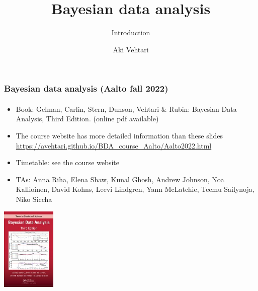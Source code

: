 \documentclass[english,t]{beamer}
\date{}
\title[]{Bayesian data analysis}
\subtitle{Introduction}
\author{Aki Vehtari}
\institute[Aalto University]{}
\begin{document}
\begin{frame}
  \frametitle{Bayesian data analysis (Aalto fall 2022)}  %
  \framesubtitle{}
  \begin{itemize}
  \item Book: Gelman, Carlin, Stern, Dunson, Vehtari \& Rubin: Bayesian Data
    Analysis, Third Edition. {\footnotesize (online pdf available)}
  \item The course website has more detailed information than these slides\\
    {\small\url{https://avehtari.github.io/BDA_course_Aalto/Aalto2022.html}}
  \item Timetable: see the course website
  \item TAs: Anna Riha, Elena Shaw, Kunal Ghosh, Andrew Johnson, Noa
    Kallioinen, David Kohns, Leevi Lindgren, Yann McLatchie, Teemu
    Sailynoja, Niko Siccha
    \end{itemize}
    \vspace{-0.25\baselineskip}
 \begin{center}
   \includegraphics[width=2.6cm]{figs/BDA3.jpg}
 \end{center}

\end{frame}


  
\end{document}
